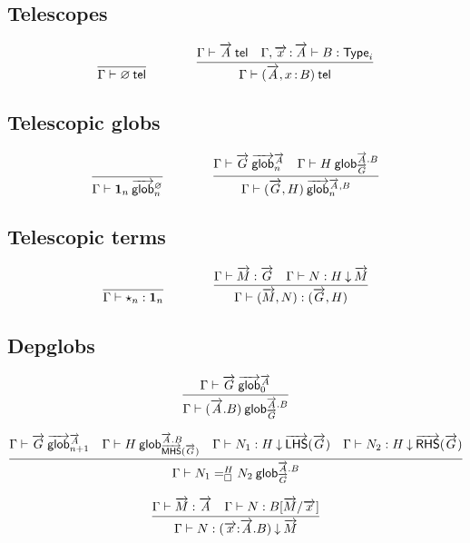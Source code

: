 \subsection{Telescopes}

\begin{small}
  \[
  \infer{\wftel{\Gamma}{\emptytel}}{}
  \qquad\qquad
  \infer
    {\wftel{\Gamma}{(\tel A,\tptm{x}{B})}}
    {\wftel{\Gamma}{\tel A}
    & \wftype{\Gamma,\teltm xA}{B}}
  \]
\end{small}

\subsection{Telescopic globs}

\begin{small}
  \[
  \infer
    {\wfglob{\Gamma}{\unitglob n}{\emptytel}n}
    {}
  \qquad\qquad
  \infer
    {\wfglob{\Gamma}{(\tel G,H)}{\tel A,B}n}
    {\wfglob{\Gamma}{\tel G}{\tel A}n
    &\wfdepglob{\Gamma}{H}{\tel A.B}{\tel G}}
  \]
\end{small}

\subsection{Telescopic terms}

\begin{small}
  \[
  \infer
    {\ofglob{\Gamma}{\unitglobelt n}{\unitglob n}}
    {}
  \qquad\qquad
  \infer
    {\ofglob{\Gamma}{(\tel M,N)}{(\tel G,H)}}
    {\ofglob{\Gamma}{\tel M}{\tel G}
    &\ofdepglob{\Gamma}{N}{H}{\tel M}}
  \]
\end{small}

\subsection{Depglobs}

\begin{small}
\[
\infer
  {\wfdepglob{\Gamma}{(\tel A.B)}{\tel{A}.B}{\tel{G}}}
  {\wfglob{\Gamma}{\tel G}{\tel A}0}
\]

\[
\infer
  {\wfdepglob{\Gamma}{\dhomj{H}{N_1}{N_2}{\blank}}{\tel A.B}{\tel G}}
  {\wfglob{\Gamma}{\tel G}{\tel A}{n+1}
  &\wfdepglob{\Gamma}{H}{\tel A.B}{\mhs{\tel G}}
  &\ofdepglob{\Gamma}{N_1}{H}{\lhs{\tel G}}
  &\ofdepglob{\Gamma}{N_2}{H}{\rhs{\tel G}}}
\]
\end{small}

\[
\infer
  {\ofdepglob{\Gamma}{N}{(\tel{x}{:}\tel{A}.B)}{\tel{M}}}
  {\ofglob{\Gamma}{\tel{M}}{\tel{A}}
  &\ofglob{\Gamma}{N}{B[\tel{M}/\tel{x}]}}
\]

